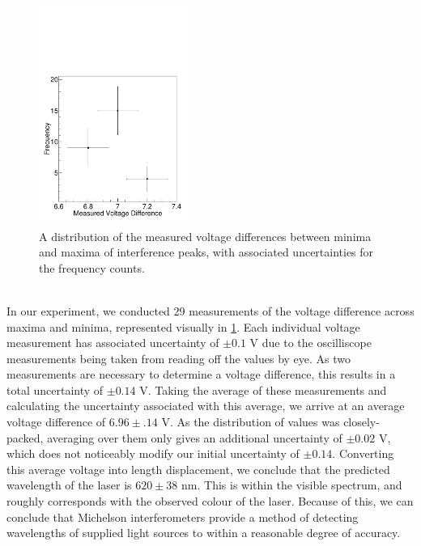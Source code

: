     \begin{figure}[h]
      \includegraphics[width=0.45\textwidth]{graph_helvetica.pdf}
      \caption{A distribution of the measured voltage differences between minima and maxima of interference peaks, with associated uncertainties for the frequency counts.}
      \label{fig:graph}
    \end{figure}
    \\
    In our experiment, we conducted 29 measurements of the voltage difference across maxima and minima, represented visually in \ref{fig:graph}. Each individual voltage measurement has associated uncertainty of $\pm 0.1$ V due to the oscilliscope measurements being taken from reading off the values by eye. As two measurements are necessary to determine a voltage difference, this results in a total uncertainty of $\pm 0.14$ V. Taking the average of these measurements and calculating the uncertainty associated with this average, we arrive at an average voltage difference of $6.96 \pm .14 $ V. As the distribution of values was closely-packed, averaging over them only gives an additional uncertainty of $\pm 0.02$ V, which does not noticeably modify our initial uncertainty of $\pm 0.14$. Converting this average voltage into length displacement, we conclude that the predicted wavelength of the laser is $620 \pm 38$ nm. This is within the visible spectrum, and roughly corresponds with the observed colour of the laser. Because of this, we can conclude that Michelson interferometers provide a method of detecting wavelengths of supplied light sources to within a reasonable degree of accuracy.
    
